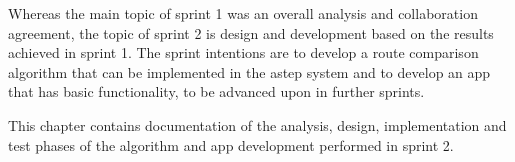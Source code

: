 Whereas the main topic of sprint 1 was an overall analysis and collaboration agreement, the topic of sprint 2 is design and development based on the results achieved in sprint 1. 
The sprint intentions are to develop a route comparison algorithm that can be implemented in the \gls{astep} system and to develop an app that has basic functionality, to be advanced upon in further sprints.

This chapter contains documentation of the analysis, design, implementation and test phases of the algorithm and app development performed in sprint 2.